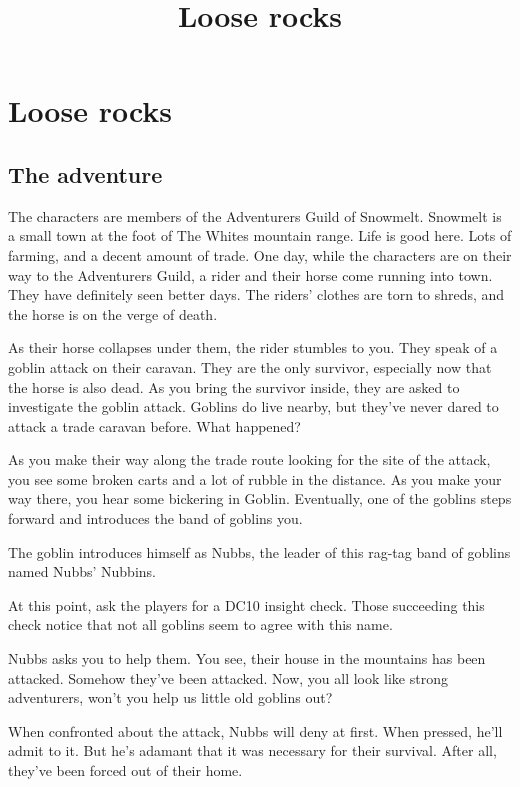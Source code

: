 \documentclass[10pt,twoside,twocolumn,openany,nodeprecatedcode,a4paper,bg=full]{dndbook}
\title{Loose rocks}
\begin{document}
\section{Loose rocks}
\subsection{The adventure}
The characters are members of the Adventurers Guild of Snowmelt. Snowmelt is a
small town at the foot of The Whites mountain range. Life is good here. Lots of
farming, and a decent amount of trade. One day, while the characters are on
their way to the Adventurers Guild, a rider and their horse come running into
town. They have definitely seen better days. The riders' clothes are torn to
shreds, and the horse is on the verge of death.

\begin{DndReadAloud}
  As their horse collapses under them, the rider stumbles to you. They speak of
  a goblin attack on their caravan. They are the only survivor, especially now
  that the horse is also dead. As you bring the survivor inside, they are asked
  to investigate the goblin attack. Goblins do live nearby, but they've never
  dared to attack a trade caravan before. What happened?

  As you make their way along the trade route looking for the site of the
  attack, you see some broken carts and a lot of rubble in the distance. As you
  make your way there, you hear some bickering in Goblin. Eventually, one of
  the goblins steps forward and introduces the band of goblins you.

  The goblin introduces himself as Nubbs, the leader of this rag-tag band of
  goblins named Nubbs' Nubbins.
\end{DndReadAloud}

At this point, ask the players for a DC10 insight check. Those succeeding this
check notice that not all goblins seem to agree with this name.

\begin{DndReadAloud}
  Nubbs asks you to help them. You see, their house in the mountains has been
  attacked. Somehow they've been attacked. Now, you all look like strong
  adventurers, won't you help us little old goblins out?
\end{DndReadAloud}

When confronted about the attack, Nubbs will deny at first. When pressed, he'll
admit to it. But he's adamant that it was necessary for their survival. After
all, they've been forced out of their home.
\end{document}
